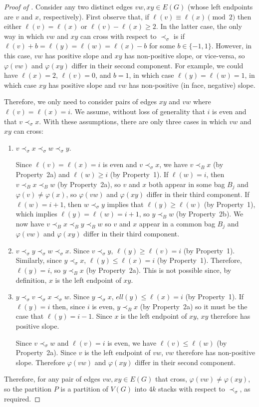 \documentclass{patmorin}
\begin{document}
\begin{proof}[Proof of ]
  Consider any two distinct edges $vw,xy\in E(G)$ (whose left endpoints are $v$ and $x$, respectively).  First observe that, if $\ell(v)\equiv \ell(x)\pmod 2$ then either $\ell(v)=\ell(x)$ or $\ell(v)-\ell(x)\ge 2$. In the latter case, the only way in which $vw$ and $xy$ can cross with respect to $\prec_\sigma$ is if $\ell(v)+b = \ell(y)=\ell(w) = \ell(x)-b$ for some $b\in\{-1,1\}$.  However, in this case, $vw$ has positive slope and $xy$ has non-positive slope, or vice-versa, so $\varphi(vw)$ and $\varphi(xy)$ differ in their second component.  For example, we could have $\ell(x)=2$, $\ell(v)=0$, and $b=1$, in which case $\ell(y)=\ell(w)=1$, in which case $xy$ has positive slope and $vw$ has non-positive (in face, negative) slope.

  Therefore, we only need to consider pairs of edges $xy$ and $vw$ where $\ell(v)=\ell(x)=i$. We assume, without loss of generality that $i$ is even
  and that $v\prec_\sigma x$.  With these assumptions, there are only three cases in which $vw$ and $xy$ can cross:
  \begin{enumerate}
    \item $v\prec_\sigma x\prec_\sigma w\prec_\sigma y$.

    Since $\ell(v)=\ell(x)=i$ is even and $v\prec_\sigma x$, we have $v\prec_B x$  (by Property~2a) and $\ell(w)\ge i$ (by Property~1).  If $\ell(w)=i$, then $v\prec_B x\prec_B w$ (by Property~2a), so $v$ and $x$ both appear in some bag $B_j$ and $\varphi(v)\neq\varphi(x)$, so $\varphi(vw)$ and $\varphi(xy)$ differ in their third component.  If $\ell(w)=i+1$, then $w\prec_\sigma y$ implies that $\ell(y)\ge\ell(w)$ (by Property~1), which implies $\ell(y)=\ell(w)=i+1$, so $y\prec_B w$ (by Property~2b).  We now have $v\prec_B x\prec_B y\prec_B w$ so $v$ and $x$ appear in a common bag $B_j$ and $\varphi(vw)$ and $\varphi(xy)$ differ in their third component.

    \item $v\prec_\sigma y\prec_\sigma w\prec_\sigma x$.  Since $v\prec_\sigma y$, $\ell(y)\ge \ell(v)=i$ (by Property~1).  Similarly, since $y\prec_\sigma x$, $\ell(y)\le\ell(x)=i$ (by Property~1).  Therefore, $\ell(y)=i$, so $y\prec_B x$ (by Property~2a).  This is not possible since, by definition, $x$ is the left endpoint of $xy$.

    \item $y\prec_\sigma v\prec_\sigma x\prec_\sigma w$.  Since $y\prec_\sigma x$, $ell(y)\le \ell(x)=i$ (by Property~1).  If $\ell(y)=i$ then, since $i$ is even, $y\prec_B x$ (by Property~2a) so it must be the case that $\ell(y)=i-1$. Since $x$ is the left endpoint of $xy$, $xy$ therefore has positive slope.

    Since $v\prec_\sigma w$ and $\ell(v)=i$ is even, we have $\ell(v)\le\ell(w)$ (by Property~2a). Since $v$ is the left endpoint of $vw$, $vw$ therefore has non-positive slope.  Therefore $\varphi(vw)$ and $\varphi(xy)$ differ in their second component.
  \end{enumerate}
  Therefore, for any pair of edges $vw,xy\in E(G)$ that cross, $\varphi(vw)\neq\varphi(xy)$, so the partition $P$ is a partition of $V(G)$ into $4k$ stacks with respect to $\prec_\sigma$, as required.
\end{proof}
\end{document}

